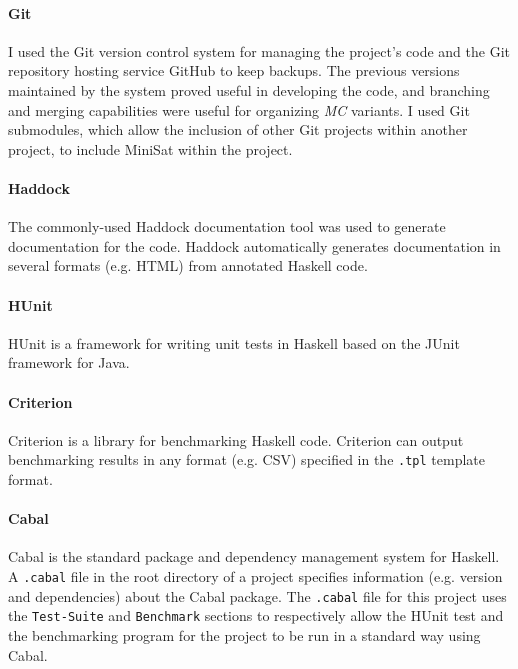 \documentclass[12pt,a4paper,twoside,openright]{report}
\begin{document}
\paragraph{Git}{
I used the Git version control system \cite{git}
for managing the project's code and the Git repository
hosting service GitHub \cite{github} to
keep backups.
The previous versions maintained by the system proved useful in
developing the code, and branching and merging capabilities were
useful for organizing \emph{MC} variants.
I used Git submodules, which allow the inclusion of other Git projects within another
project, to include MiniSat within the project.

\paragraph{Haddock}{
The commonly-used Haddock \cite{haddock} documentation tool was used to generate documentation
for the code. Haddock automatically generates documentation in
several formats (e.g. HTML) from annotated Haskell code.
}

\paragraph{HUnit}{
HUnit \cite{hunit} is a framework for writing unit tests in Haskell based on the
JUnit framework \cite{junit} for Java.
}

\paragraph{Criterion}{
Criterion \cite{criterion} is a library for benchmarking Haskell code.
Criterion can output benchmarking results in any format (e.g. CSV) specified in the \verb,.tpl,
template format.}

\paragraph{Cabal}{
Cabal \cite{cabal} is the standard package and dependency management system for Haskell.
A \verb,.cabal, file in the root directory of a project specifies
information (e.g. version and dependencies) about the Cabal package.
The \verb,.cabal, file for this project uses the \verb,Test-Suite, and \verb,Benchmark,
sections to respectively allow the HUnit test and the benchmarking
program for the project to be run in a standard way using Cabal.

}}
\end{document}
